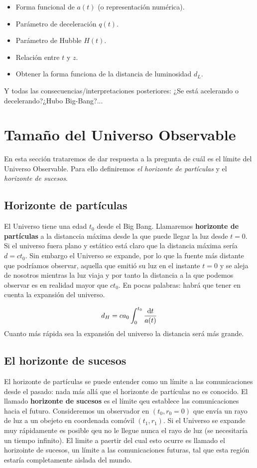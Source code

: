 \begin{itemize}
	\item Forma funcional de $a(t)$ (o representación numérica).
	\item Parámetro de deceleración $q(t)$.
	\item Parámetro de Hubble $H(t)$.
	\item Relación entre $t$ y $z$.
	\item Obtener la forma funciona de la distancia de luminosidad $d_L$.
\end{itemize}
Y todas las consecuencias/interpretaciones posteriores: ¿Se está acelerando o decelerando?¿Hubo Big-Bang?... 


\section{Tamaño del Universo Observable}

En esta sección trataremos de dar respuesta a la pregunta de cuál es el límite del Universo Observable. Para ello definiremos \textit{el horizonte de partículas} y el \textit{horizonte de sucesos}.

\subsection{Horizonte de partículas}

El Universo tiene una edad $t_0$ desde el Big Bang. Llamaremos \textbf{horizonte de partículas} a la distanccia máxima desde la que puede llegar la luz desde $t=0$. Si el universo fuera plano y estático está claro que la distancia máxima sería $d=ct_0$. Sin embargo el Universo se expande, por lo que la fuente más distante que podríamos observar, aquella que emitió su luz en el instante $t=0$ y se aleja de nosotros mientras la luz viaja y por tanto la distancia a la que podemos observar es en realidad mayor que $ct_0$. En pocas palabras: habrá que tener en cuenta la expansión del universo.

\begin{equation}
	d_H = c a_0 \int_0^{t_0} \frac{\mathrm{d} t}{a(t)}
\end{equation}
Cuanto más rápida sea la expansión del universo la distancia será más grande.

\subsection{El horizonte de sucesos}

El horizonte de partículas se puede entender como un límite a las comunicaciones desde el pasado: nada más allá que el horizonte de partículas no es conocido. El llamado \textbf{horizonte de sucesos} es el límite qeu establece las comunicaciones hacia el futuro. Consideremos un observador en $(t_0,r_0=0)$ que envía un rayo de luz a un obejeto en coordenada comóvil $(t_1,r_1)$. Si el Universo se expande muy rápidamente es posible qeu no le llegue nunca el rayo de luz (se necesitaría un tiempo infinito). El limite a paertir del cual esto ocurre es llamado el horizointe de sucesos, un límite a las comunicaciones futuras, tal que esta región estaría completamente aislada del mundo.

